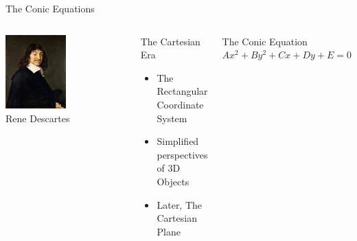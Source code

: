 \documentclass[14pt,aspectratio=169]{beamer}
\begin{document}
\begin{frame}{The Conic Equations}
 \begin{columns}
  \centering
  \includegraphics[width=0.5\textwidth]{image12.jpg}\\Rene Descartes
  \begin{block}{The Cartesian Era}
   \begin{itemize}
    \item The Rectangular Coordinate System
    \item Simplified perspectives of 3D Objects
    \item Later, The Cartesian Plane
   \end{itemize}

  \end{block}

  \begin{block}{The Conic Equation}
   $Ax^2 + By^2 + Cx + Dy + E = 0$
  \end{block}

 \end{columns}

\end{frame}
\end{document}
